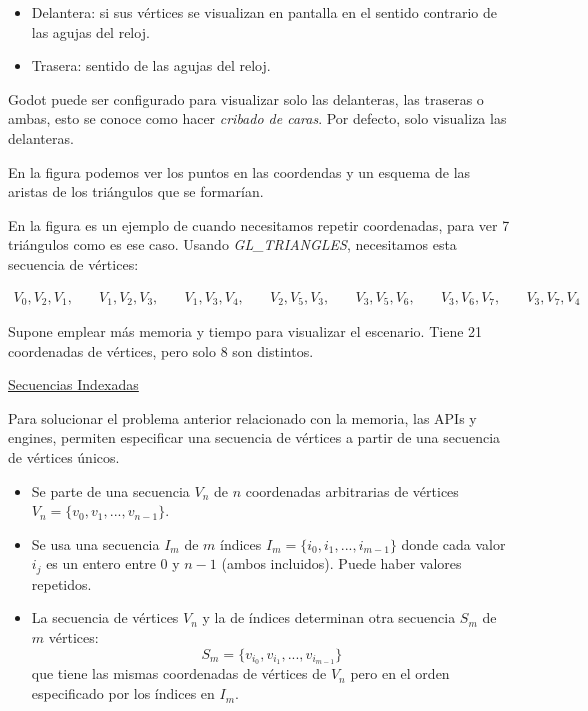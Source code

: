 \documentclass[12pt]{report} %
\providecommand{\tightlist}{%
  \setlength{\itemsep}{0pt}\setlength{\parskip}{0pt}}
\begin{document}
\begin{itemize}
\tightlist
\item
  Delantera: si sus vértices se visualizan en pantalla en el sentido
  contrario de las agujas del reloj.
\item
  Trasera: sentido de las agujas del reloj.
\end{itemize}

Godot puede ser configurado para visualizar solo las delanteras, las
traseras o ambas, esto se conoce como hacer \emph{cribado de caras}. Por
defecto, solo visualiza las delanteras.


En la figura \label{fig:pr1} podemos ver los puntos en las coordendas y
un esquema de las aristas de los triángulos que se formarían.

En la figura \label{fig:pr22} es un ejemplo de cuando necesitamos
repetir coordenadas, para ver 7 triángulos como es ese caso. Usando
\emph{GL\_TRIANGLES}, necesitamos esta secuencia de vértices:

\begin{align*}
V_0, V_2, V_1, & \quad V_1, V_2, V_3, & \quad V_1, V_3, V_4, & \quad V_2, V_5, V_3, & \quad V_3, V_5, V_6, & \quad V_3, V_6, V_7, & \quad V_3, V_7, V_4
\end{align*}

Supone emplear más memoria y tiempo para visualizar el escenario. Tiene
21 coordenadas de vértices, pero solo 8 son distintos.

\underline{Secuencias Indexadas}

Para solucionar el problema anterior relacionado con la memoria, las
APIs y engines, permiten especificar una secuencia de vértices a partir
de una secuencia de vértices únicos.

\begin{itemize}
\item Se parte de una secuencia $V_n$ de $n$ coordenadas arbitrarias de vértices $V_n = \{v_0, v_1, ..., v_{n-1}\}$.
\item Se usa una secuencia $I_m$ de $m$ índices $I_m = \{i_0, i_1, ..., i_{m-1}\}$ donde cada valor $i_j$ es un entero entre $0$ y $n-1$ (ambos incluidos). Puede haber valores repetidos.
\item La secuencia de vértices $V_n$ y la de índices determinan otra secuencia $S_m$ de $m$ vértices:
\[
S_m = \{v_{i_0}, v_{i_1}, ..., v_{i_{m-1}}\}
\]
que tiene las mismas coordenadas de vértices de $V_n$ pero en el orden especificado por los índices en $I_m$.
\end{itemize}
\end{document}
